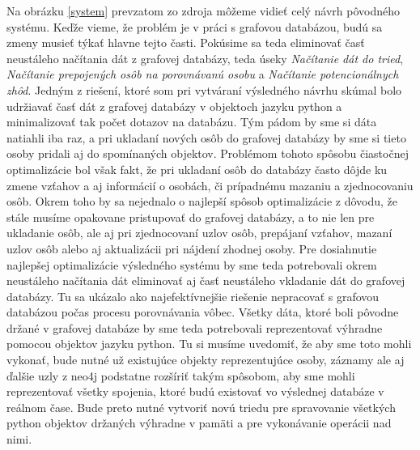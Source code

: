 Na obrázku \ref{system} prevzatom zo zdroja \cite{formalniDP} môžeme vidieť celý návrh pôvodného systému. Keďže vieme, že problém je v práci s grafovou databázou, budú sa zmeny musieť týkať hlavne tejto časti. Pokúsime sa teda eliminovať časť neustáleho načítania dát z grafovej databázy, teda úseky \textit{Načítanie dát do tried}, \textit{Načítanie prepojených osôb na porovnávanú osobu} a \textit{Načítanie potencionálnych zhôd}. Jedným z riešení, ktoré som pri vytváraní výsledného návrhu skúmal bolo udržiavať časť dát z grafovej databázy v objektoch jazyku python a minimalizovať tak počet dotazov na databázu. Tým pádom by sme si dáta natiahli iba raz, a pri ukladaní nových osôb do grafovej databázy by sme si tieto osoby pridali aj do spomínaných objektov. Problémom tohoto spôsobu čiastočnej optimalizácie bol však fakt, že pri ukladaní osôb do databázy často dôjde ku zmene vzťahov a aj informácií o osobách, či prípadnému mazaniu a zjednocovaniu osôb. Okrem toho by sa nejednalo o najlepší spôsob optimalizácie z dôvodu, že stále musíme opakovane pristupovať do grafovej databázy, a to nie len pre ukladanie osôb, ale aj pri zjednocovaní uzlov osôb, prepájaní vzťahov, mazaní uzlov osôb alebo aj aktualizácii pri nájdení zhodnej osoby. Pre dosiahnutie najlepšej optimalizácie výsledného systému by sme teda potrebovali okrem neustáleho načítania dát eliminovať aj časť neustáleho vkladanie dát do grafovej databázy. Tu sa ukázalo ako najefektívnejšie riešenie nepracovať s grafovou databázou počas procesu porovnávania vôbec. Všetky dáta, ktoré boli pôvodne držané v grafovej databáze by sme teda potrebovali reprezentovať výhradne pomocou objektov jazyku python. Tu si musíme uvedomiť, že aby sme toto mohli vykonať, bude nutné už existujúce objekty reprezentujúce osoby, záznamy ale aj ďalšie uzly z neo4j podstatne rozšíriť takým spôsobom, aby sme mohli reprezentovať všetky spojenia, ktoré budú existovať vo výslednej databáze v reálnom čase. Bude preto nutné vytvoriť novú triedu pre spravovanie všetkých python objektov držaných výhradne v pamäti a pre vykonávanie operácii nad nimi.

